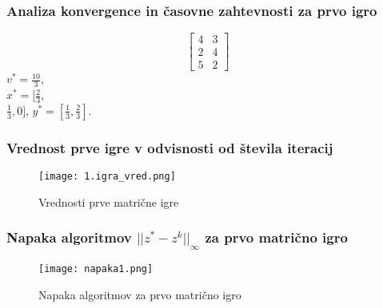 \documentclass{beamer}
\theoremstyle{definition}
\theoremstyle{plain}
\begin{document}
\begin{frame}
    \frametitle{Analiza konvergence in časovne zahtevnosti za prvo igro}
    \begin{equation*}
        \begin{bmatrix}
            4 & 3\\
            2 & 4\\
            5 & 2
        \end{bmatrix}
        \end{equation*}
     $v^* = \frac{10}{3}$, \\
     $x^* = [\frac{2}{3}$, \\
     $\frac{1}{3}, 0]$, $y^* = [\frac{1}{3}, \frac{2}{3}]$.
\end{frame}
\begin{frame}
    \frametitle{Vrednost prve igre v odvisnosti od števila iteracij}
    \begin{figure}
        \centering
        \texttt{[image: 1.igra\_vred.png]}
        \caption{Vrednosti prve matrične igre}
        \label{fig:vred1}
      \end{figure}
\end{frame}
\begin{frame}
    \frametitle{Napaka algoritmov $||z^* - z^{k}||_{\infty}$ za prvo matrično igro}
    \begin{figure}
        \centering
        \texttt{[image: napaka1.png]}
        \caption{Napaka algoritmov za prvo matrično igro}
        \label{fig:napaka1}
      \end{figure}
\end{frame}
\end{document}
